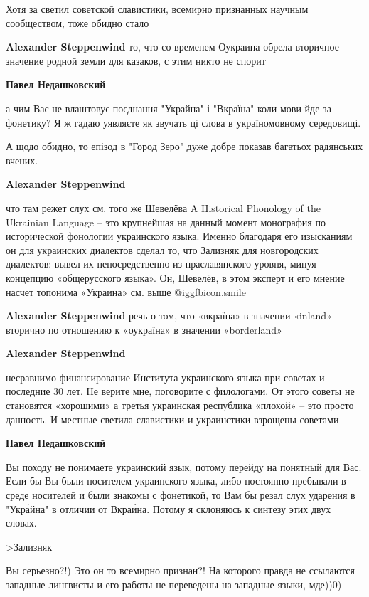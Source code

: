 \begin{itemize}
\begin{itemize}
Хотя за светил советской славистики, всемирно признанных научным сообществом,
тоже обидно стало

\textbf{Alexander Steppenwind} то, что со временем Оукраина обрела вторичное значение родной земли для казаков, с этим никто не спорит

\textbf{Павел Недашковский} 

а чим Вас не влаштовує поєднання "Украйна" і "Вкраїна" коли мови йде за
фонетику? Я ж гадаю уявляєте як звучать ці слова в україномовному середовищі.

А щодо обидно, то епізод в "Город Зеро" дуже добре показав багатьох радянських
вчених.

\textbf{Alexander Steppenwind} 

что там режет слух см. того же Шевелёва A Historical Phonology of the Ukrainian
Language – это крупнейшая на данный момент монография по исторической фонологии
украинского языка. Именно благодаря его изысканиям он для украинских диалектов
сделал то, что Зализняк для новгородских диалектов: вывел их непосредственно из
праславянского уровня, минуя концепцию «общерусского языка». Он, Шевелёв, в
этом эксперт и его мнение насчет топонима «Украина» см. выше  @igg{fbicon.smile} 

\textbf{Alexander Steppenwind} речь о том, что «вкраїна» в значении «inland» вторично по отношению к «оукраїна» в значении «borderland»

\textbf{Alexander Steppenwind} 

несравнимо финансирование Института украинского языка при советах и последние
30 лет. Не верите мне, поговорите с филологами. От этого советы не становятся
«хорошими» а третья украинская республика «плохой» – это просто данность. И
местные светила славистики и украинстики взрощены советами

\textbf{Павел Недашковский} 

Вы походу не понимаете украинский язык, потому перейду на понятный для Вас.
Если бы Вы были носителем украинского языка, либо постоянно пребывали в среде
носителей и были знакомы с фонетикой, то Вам бы резал слух ударения в "Укра́йна"
в отличии от Вкраи́на. Потому я склоняюсь к синтезу этих двух словах.

>Зализняк

Вы серьезно?!) Это он то всемирно признан?! На которого правда не ссылаются
западные лингвисты и его работы не переведены на западные языки, мде))0)


\end{itemize}
\end{itemize}
